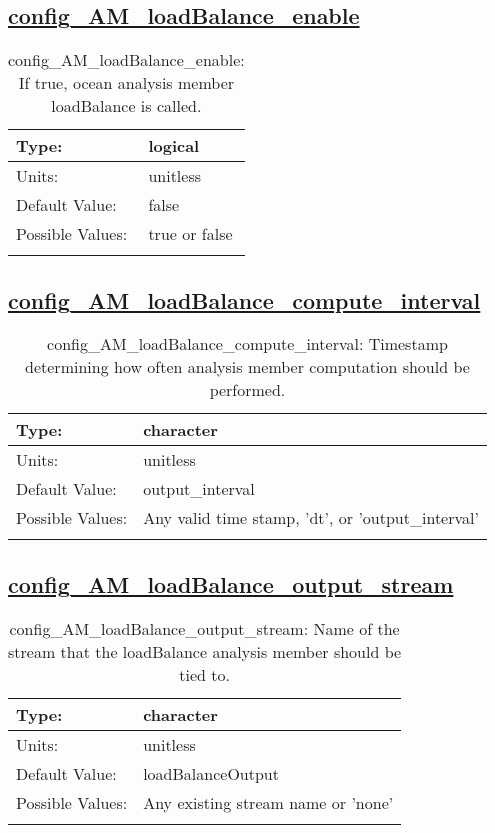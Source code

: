 \subsection[config\_AM\_loadBalance\_enable]{\hyperref[sec:nm_tab_AM_loadBalance]{config\_AM\_loadBalance\_enable}}
\label{subsec:nm_sec_config_AM_loadBalance_enable}
\begin{center}
\begin{longtable}{| p{2.0in} || p{4.0in} |}
    \hline
    Type: & logical \\
    \hline
    Units: & \si{unitless} \\
    \hline
    Default Value: & false \\
    \hline
    Possible Values: & true or false \\
    \hline
    \caption{config\_AM\_loadBalance\_enable: If true, ocean analysis member loadBalance is called.}
\end{longtable}
\end{center}
\subsection[config\_AM\_loadBalance\_compute\_interval]{\hyperref[sec:nm_tab_AM_loadBalance]{config\_AM\_loadBalance\_compute\_interval}}
\label{subsec:nm_sec_config_AM_loadBalance_compute_interval}
\begin{center}
\begin{longtable}{| p{2.0in} || p{4.0in} |}
    \hline
    Type: & character \\
    \hline
    Units: & \si{unitless} \\
    \hline
    Default Value: & output\_interval \\
    \hline
    Possible Values: & Any valid time stamp, 'dt', or 'output\_interval' \\
    \hline
    \caption{config\_AM\_loadBalance\_compute\_interval: Timestamp determining how often analysis member computation should be performed.}
\end{longtable}
\end{center}
\subsection[config\_AM\_loadBalance\_output\_stream]{\hyperref[sec:nm_tab_AM_loadBalance]{config\_AM\_loadBalance\_output\_stream}}
\label{subsec:nm_sec_config_AM_loadBalance_output_stream}
\begin{center}
\begin{longtable}{| p{2.0in} || p{4.0in} |}
    \hline
    Type: & character \\
    \hline
    Units: & \si{unitless} \\
    \hline
    Default Value: & loadBalanceOutput \\
    \hline
    Possible Values: & Any existing stream name or 'none' \\
    \hline
    \caption{config\_AM\_loadBalance\_output\_stream: Name of the stream that the loadBalance analysis member should be tied to.}
\end{longtable}
\end{center}
